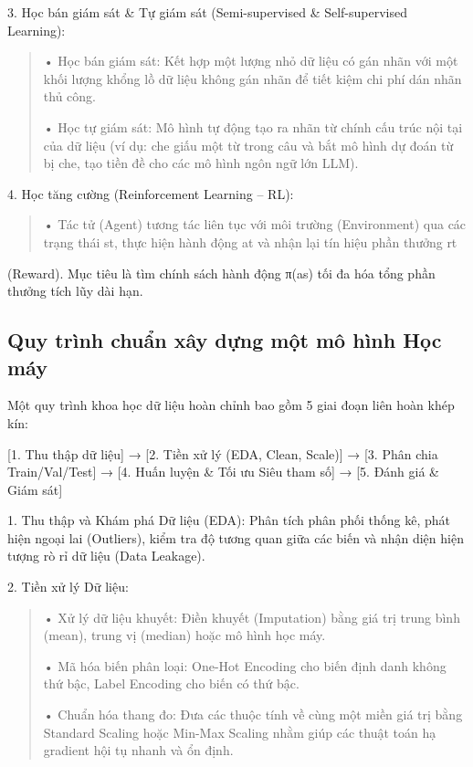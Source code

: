 3. Học bán giám sát \& Tự giám sát (Semi-supervised \& Self-supervised
Learning):

\begin{quote}
• Học bán giám sát: Kết hợp một lượng nhỏ dữ liệu có gán nhãn với một
khối lượng khổng lồ dữ liệu không gán nhãn để tiết kiệm chi phí dán nhãn
thủ công.

• Học tự giám sát: Mô hình tự động tạo ra nhãn từ chính cấu trúc nội tại
của dữ liệu (ví dụ: che giấu một từ trong câu và bắt mô hình dự đoán từ
bị che, tạo tiền đề cho các mô hình ngôn ngữ lớn LLM).
\end{quote}

4. Học tăng cường (Reinforcement Learning -- RL):

\begin{quote}
• Tác tử (Agent) tương tác liên tục với môi trường (Environment) qua các
trạng thái st, thực hiện hành động at và nhận lại tín hiệu phần thưởng
rt
\end{quote}

(Reward). Mục tiêu là tìm chính sách hành động π(a\textbar s) tối đa hóa
tổng phần thưởng tích lũy dài hạn.

\subsection{Quy trình chuẩn xây dựng một mô hình Học máy}\label{quy-truxecnh-chuux1ea9n-xuxe2y-dux1ef1ng-mux1ed9t-muxf4-huxecnh-hux1ecdc-muxe1y}

Một quy trình khoa học dữ liệu hoàn chỉnh bao gồm 5 giai đoạn liên hoàn
khép kín:

{[}1. Thu thập dữ liệu{]} → {[}2. Tiền xử lý (EDA, Clean, Scale){]} →
{[}3. Phân chia Train/Val/Test{]} → {[}4. Huấn luyện \& Tối ưu Siêu tham
số{]} → {[}5. Đánh giá \& Giám sát{]}

1. Thu thập và Khám phá Dữ liệu (EDA): Phân tích phân phối thống kê,
phát hiện ngoại lai (Outliers), kiểm tra độ tương quan giữa các biến và
nhận diện hiện tượng rò rỉ dữ liệu (Data Leakage).

2. Tiền xử lý Dữ liệu:

\begin{quote}
• Xử lý dữ liệu khuyết: Điền khuyết (Imputation) bằng giá trị trung bình
(mean), trung vị (median) hoặc mô hình học máy.

• Mã hóa biến phân loại: One-Hot Encoding cho biến định danh không thứ
bậc, Label Encoding cho biến có thứ bậc.

• Chuẩn hóa thang đo: Đưa các thuộc tính về cùng một miền giá trị bằng
Standard Scaling hoặc Min-Max Scaling nhằm giúp các thuật toán hạ
gradient hội tụ nhanh và ổn định.
\end{quote}

